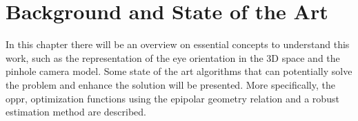 
\chapter{Background and State of the Art}
\label{backgroundandsota}

In this chapter there will be an overview on essential concepts to understand this work, such as the representation of the eye orientation in the 3D space and the pinhole camera model. Some state of the art algorithms that can potentially solve the problem and enhance the solution will be presented. More specifically, the \acrlong{oppr}, optimization functions using the epipolar geometry relation and a robust estimation method are described.








